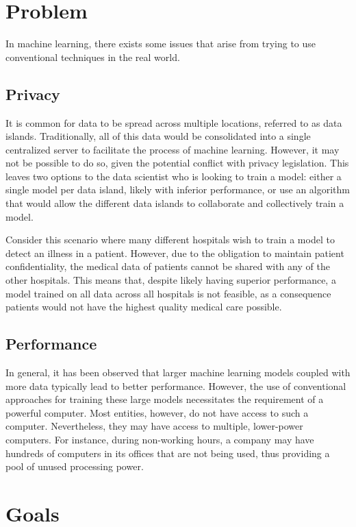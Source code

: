 \section{Problem}
In machine learning, there exists some issues that arise from trying to use conventional techniques in the real world.

\subsection{Privacy}
It is common for data to be spread across multiple locations, referred to as data islands. Traditionally, all of this data would be consolidated into a single centralized server to facilitate the process of machine learning. However, it may not be possible to do so, given the potential conflict with privacy legislation. This leaves two options to the data scientist who is looking to train a model: either a single model per data island, likely with inferior performance, or use an algorithm that would allow the different data islands to collaborate and collectively train a model.

Consider this scenario where many different hospitals wish to train a model to detect an illness in a patient. However, due to the obligation to maintain patient confidentiality, the medical data of patients cannot be shared with any of the other hospitals. This means that, despite likely having superior performance, a model trained on all data across all hospitals is not feasible, as a consequence patients would not have the highest quality medical care possible.

\subsection{Performance}
In general, it has been observed that larger machine learning models coupled with more data typically lead to better performance. However, the use of conventional approaches for training these large models necessitates the requirement of a powerful computer. Most entities, however, do not have access to such a computer. Nevertheless, they may have access to multiple, lower-power computers. For instance, during non-working hours, a company may have hundreds of computers in its offices that are not being used, thus providing a pool of unused processing power.

\section{Goals}

